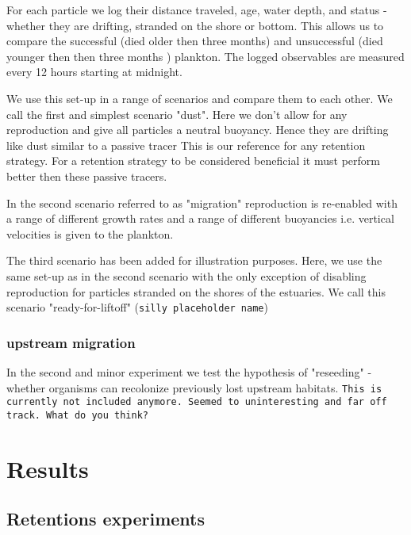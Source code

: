 For each particle we log their distance traveled, age, water depth, and status - whether they are drifting, stranded on the shore or bottom.
This allows us to compare the successful (died older then three months) and unsuccessful (died younger then then three months ) plankton.
The logged observables are measured every 12 hours starting at midnight.

\medskip

We use this set-up in a range of scenarios and compare them to each other.
We call the first and simplest scenario "dust". 
Here we don't allow for any reproduction and give all particles a neutral buoyancy.
Hence they are drifting like dust similar to a passive tracer
This is our reference for any retention strategy. 
For a retention strategy to be considered beneficial it must perform better then these passive tracers.

In the second scenario referred to as "migration" reproduction is re-enabled with a range of different growth rates 
and a range of different buoyancies i.e. vertical velocities is given to the plankton.

The third scenario has been added for illustration purposes.
Here, we use the same set-up as in the second scenario with the only exception of disabling reproduction for particles stranded on the shores of the estuaries.
We call this scenario "ready-for-liftoff" (\texttt{silly placeholder name})
\label{txt:ready-for-liftoff}

\subsubsection*{upstream migration}

In the second and minor experiment we test the hypothesis of "reseeding" - whether organisms can recolonize previously lost upstream habitats.
\texttt{This is currently not included anymore. Seemed to uninteresting and far off track. What do you think?}


\section*{Results}

\subsection*{Retentions experiments}

